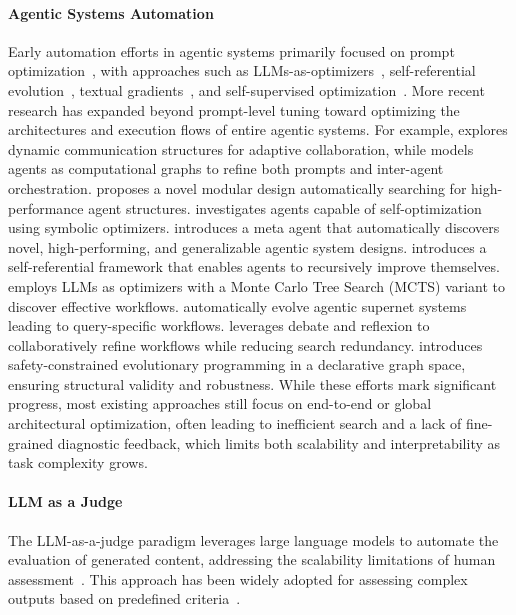 \documentclass{article}
\theoremstyle{plain}
\theoremstyle{definition}
\theoremstyle{remark}
\begin{document}
\paragraph{Agentic Systems Automation} 
Early automation efforts in agentic systems primarily focused on prompt optimization~\citep{pryzant_automatic_2023, ramnath_systematic_2025, li_survey_2025}, with approaches such as LLMs-as-optimizers~\citep{yang_large_2024}, self-referential evolution~\citep{fernando_promptbreeder_2023}, textual gradients~\citep{yuksekgonul_textgrad_2024}, and self-supervised optimization~\citep{xiang_self-supervised_2025}. More recent research has expanded beyond prompt-level tuning toward optimizing the architectures and execution flows of entire agentic systems. For example, \citet{liu_dynamic_2024} explores dynamic communication structures for adaptive collaboration, while \citet{zhuge_language_2024} models agents as computational graphs to refine both prompts and inter-agent orchestration. \citet{shang_agentsquare_2024} proposes a novel modular design automatically searching for high-performance agent structures. \citet{zhou_symbolic_2024} investigates agents capable of self-optimization using symbolic optimizers. \citet{hu_automated_2025} introduces a meta agent that automatically discovers novel, high-performing, and generalizable agentic system designs. \citet{yin_goagent_2025} introduces a self-referential framework that enables agents to recursively improve themselves. \citet{zhang_aflow_2025} employs LLMs as optimizers with a Monte Carlo Tree Search (MCTS) variant to discover effective workflows. \citet{zhang_multi-agent_2025} automatically evolve agentic supernet systems leading to query-specific workflows. \citet{su_debflow_2025} leverages debate and reflexion to collaboratively refine workflows while reducing search redundancy. \citet{zheng_mermaidflow_2025} introduces safety-constrained evolutionary programming in a declarative graph space, ensuring structural validity and robustness. While these efforts mark significant progress, most existing approaches still focus on end-to-end or global architectural optimization, often leading to inefficient search and a lack of fine-grained diagnostic feedback, which limits both scalability and interpretability as task complexity grows.

\paragraph{LLM as a Judge}
The LLM-as-a-judge paradigm leverages large language models to automate the evaluation of generated content, addressing the scalability limitations of human assessment~\citep{gu_survey_2025}. This approach has been widely adopted for assessing complex outputs based on predefined criteria~\citep{li_llms-as-judges_2024}. 
\end{document}
